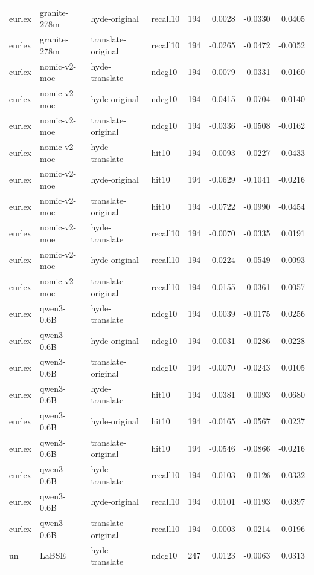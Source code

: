 \begin{tabular}{llllrrrr}
eurlex & granite-278m & hyde-original & recall10 & 194 & 0.0028 & -0.0330 & 0.0405 \\
eurlex & granite-278m & translate-original & recall10 & 194 & -0.0265 & -0.0472 & -0.0052 \\
eurlex & nomic-v2-moe & hyde-translate & ndcg10 & 194 & -0.0079 & -0.0331 & 0.0160 \\
eurlex & nomic-v2-moe & hyde-original & ndcg10 & 194 & -0.0415 & -0.0704 & -0.0140 \\
eurlex & nomic-v2-moe & translate-original & ndcg10 & 194 & -0.0336 & -0.0508 & -0.0162 \\
eurlex & nomic-v2-moe & hyde-translate & hit10 & 194 & 0.0093 & -0.0227 & 0.0433 \\
eurlex & nomic-v2-moe & hyde-original & hit10 & 194 & -0.0629 & -0.1041 & -0.0216 \\
eurlex & nomic-v2-moe & translate-original & hit10 & 194 & -0.0722 & -0.0990 & -0.0454 \\
eurlex & nomic-v2-moe & hyde-translate & recall10 & 194 & -0.0070 & -0.0335 & 0.0191 \\
eurlex & nomic-v2-moe & hyde-original & recall10 & 194 & -0.0224 & -0.0549 & 0.0093 \\
eurlex & nomic-v2-moe & translate-original & recall10 & 194 & -0.0155 & -0.0361 & 0.0057 \\
eurlex & qwen3-0.6B & hyde-translate & ndcg10 & 194 & 0.0039 & -0.0175 & 0.0256 \\
eurlex & qwen3-0.6B & hyde-original & ndcg10 & 194 & -0.0031 & -0.0286 & 0.0228 \\
eurlex & qwen3-0.6B & translate-original & ndcg10 & 194 & -0.0070 & -0.0243 & 0.0105 \\
eurlex & qwen3-0.6B & hyde-translate & hit10 & 194 & 0.0381 & 0.0093 & 0.0680 \\
eurlex & qwen3-0.6B & hyde-original & hit10 & 194 & -0.0165 & -0.0567 & 0.0237 \\
eurlex & qwen3-0.6B & translate-original & hit10 & 194 & -0.0546 & -0.0866 & -0.0216 \\
eurlex & qwen3-0.6B & hyde-translate & recall10 & 194 & 0.0103 & -0.0126 & 0.0332 \\
eurlex & qwen3-0.6B & hyde-original & recall10 & 194 & 0.0101 & -0.0193 & 0.0397 \\
eurlex & qwen3-0.6B & translate-original & recall10 & 194 & -0.0003 & -0.0214 & 0.0196 \\
un & LaBSE & hyde-translate & ndcg10 & 247 & 0.0123 & -0.0063 & 0.0313 \\

\end{tabular}
